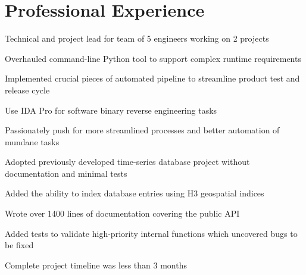 \documentclass[letterpaper]{deedy-resume}
\newcommand{\experiencespace}{\vspace{2em}}
\begin{document}
\begin{minipage}[t]{0.66\textwidth} %

	\section{Professional Experience}
	\begin{compactitem}
        \item Technical and project lead for team of 5 engineers working on 2 projects
        \item Overhauled command-line Python tool to support complex runtime requirements
        \item Implemented crucial pieces of automated pipeline to streamline product test and release cycle
        \item Use IDA Pro for software binary reverse engineering tasks
        \item Passionately push for more streamlined processes and better automation of mundane tasks
	\end{compactitem}
    \experiencespace

	\begin{compactitem}
        \item Adopted previously developed time-series database project without documentation and minimal tests
        \item Added the ability to index database entries using H3 geospatial indices
        \item Wrote over 1400 lines of documentation covering the public API
        \item Added tests to validate high-priority internal functions which uncovered bugs to be fixed
        \item Complete project timeline was less than 3 months
	\end{compactitem}
    \experiencespace


\end{minipage}
\end{document}
